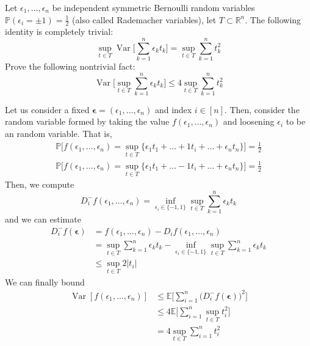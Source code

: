 \documentclass{article}
\DeclareMathOperator{\Var}{Var}
\theoremstyle{definition}
\theoremstyle{remark}
\theoremstyle{definition}
\begin{document}
  \begin{exercise}
  Let $\epsilon_1, \ldots, \epsilon_n$ be independent symmetric Bernoulli random variables $\mathbb{P}(\epsilon_i = \pm 1) = \frac{1}{2}$ (also called Rademacher variables), let $T \subset \mathbb{R}^n$. The following identity is completely trivial: 
  \[\sup_{t \in T} \Var \bigg[ \sum_{k=1}^n \epsilon_k t_k \bigg] = \sup_{t \in T} \sum_{k=1}^n t_k^2\]
  Prove the following nontrivial fact: 
  \[\Var \bigg[ \sup_{t \in T} \sum_{k=1}^n \epsilon_k t_k \bigg] \leq 4 \sup_{t \in T} \sum_{k=1}^n t_k^2\]
  \end{exercise}
  \begin{solution}
  Let us consider a fixed $\boldsymbol{\epsilon} = (\epsilon_1, \ldots, \epsilon_n)$ and index $i \in [n]$. Then, consider the random variable formed by taking the value $f(\epsilon_1, \ldots, \epsilon_n)$ and loosening $\epsilon_i$ to be an random variable. That is, 
  \begin{align*}
      \mathbb{P} \Big[ f(\epsilon_1, \ldots, \epsilon_n) = \sup_{t \in T} \{\epsilon_1 t_1 + \ldots + 1 t_i + \ldots + \epsilon_n t_n\} \Big] = \frac{1}{2} \\
      \mathbb{P} \Big[ f(\epsilon_1, \ldots, \epsilon_n) = \sup_{t \in T} \{\epsilon_1 t_1 + \ldots - 1 t_i + \ldots + \epsilon_n t_n\} \Big] = \frac{1}{2} 
  \end{align*}
  Then, we compute 
  \[D_i^- f (\epsilon_1, \ldots, \epsilon_n) = \inf_{\epsilon_i \in \{-1, 1\}} \sup_{t \in T} \sum_{k=1}^n \epsilon_k t_k\]
  and we can estimate 
  \begin{align*}
      D_i^- f(\boldsymbol{\epsilon}) & = f(\epsilon_1, \ldots, \epsilon_n) - D_i f (\epsilon_1, \ldots, \epsilon_n) \\
      & = \sup_{t \in T} \sum_{k=1}^n \epsilon_k t_k - \inf_{\epsilon_i \in \{-1, 1\}} \sup_{t \in T} \sum_{k=1}^n \epsilon_k t_k \\
      & \leq \sup_{t \in T} 2 |t_i| 
  \end{align*}
  We can finally bound 
  \begin{align*}
      \Var[ f(\epsilon_1, \ldots, \epsilon_n)] & \leq \mathbb{E} \bigg[ \sum_{i=1}^n \big( D_i^- f(\boldsymbol{\epsilon})\big)^2 \bigg] \\
      & \leq 4 \mathbb{E} \bigg[ \sum_{i=1}^n \sup_{t \in T} t_i^2 \bigg] \\
      & = 4 \sup_{t \in T} \sum_{i=1}^n t_i^2 
  \end{align*}
  \end{solution}
\end{document}
